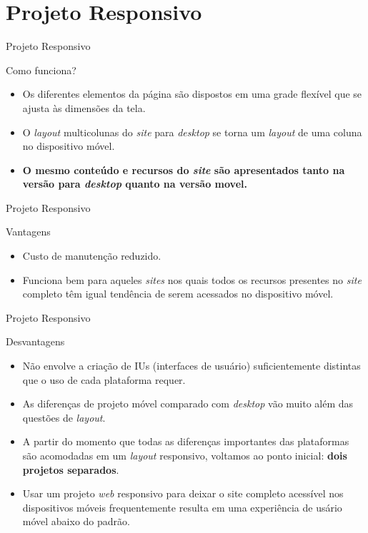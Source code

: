\section{Projeto Responsivo}

\begin{frame}{Projeto Responsivo}
\begin{block}{Como funciona?}
  \begin{itemize}
    \item<1-> Os diferentes elementos da página são dispostos em uma grade flexível que se ajusta às dimensões da tela.
    \item<2-> O \emph{layout} multicolunas do \emph{site} para \emph{desktop} se torna um \emph{layout} de uma coluna no dispositivo móvel.
    \bigskip
    \item<3->[] \textbf{O mesmo conteúdo e recursos do \emph{site} são apresentados tanto na versão para \emph{desktop} quanto na versão movel.}
  \end{itemize}
\end{block}
\end{frame}

\begin{frame}{Projeto Responsivo}
\begin{block}{Vantagens}
  \begin{itemize}
    \item<1-> Custo de manutenção reduzido.
    \item<2-> Funciona bem para aqueles \emph{sites} nos quais todos os recursos presentes no \emph{site} completo têm igual tendência de serem acessados no dispositivo móvel.
  \end{itemize}
\end{block}
\end{frame}

\begin{frame}{Projeto Responsivo}
\begin{block}{Desvantagens}
  \begin{itemize}
    \item<1-> Não envolve a criação de IUs (interfaces de usuário) suficientemente distintas que o uso de cada plataforma requer.
    \item<2-> As diferenças de projeto móvel comparado com \emph{desktop} vão muito além das questões de \emph{layout}.
    \item<3-> A partir do momento que todas as diferenças importantes das plataformas são acomodadas em um \emph{layout} responsivo, voltamos ao ponto inicial: \textbf{dois projetos separados}.
    \item<4-> Usar um projeto \emph{web} responsivo para deixar o site completo acessível nos dispositivos móveis frequentemente resulta em uma experiência de usário móvel abaixo do padrão.
  \end{itemize}
\end{block}
\end{frame}
